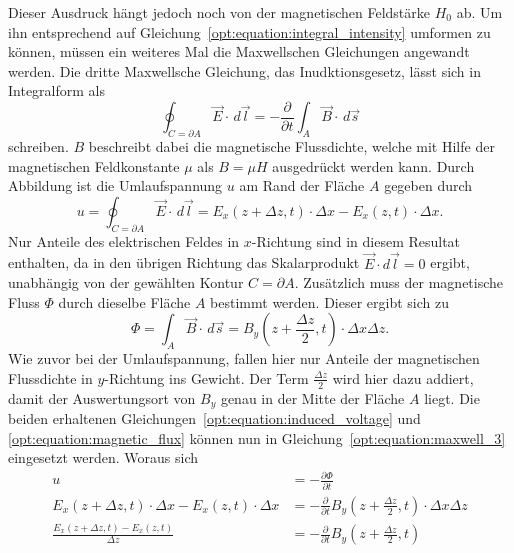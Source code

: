 Dieser Ausdruck hängt jedoch noch von der magnetischen Feldstärke $H_0$ ab.
Um ihn entsprechend auf Gleichung~\ref{opt:equation:integral_intensity} umformen zu können, müssen ein weiteres Mal die Maxwellschen Gleichungen angewandt werden.
Die dritte Maxwellsche Gleichung, das Inudktionsgesetz, lässt sich in Integralform als
\begin{equation}
\oint_{C=\partial A} \vec{E} \cdot\, d\vec{l}
=
-\frac{\partial}{\partial t} \int_{A} \vec{B} \cdot\, d\vec{s}
\label{opt:equation:maxwell_3}
\end{equation}
schreiben.
$B$ beschreibt dabei die magnetische Flussdichte, welche mit Hilfe der magnetischen Feldkonstante $\mu$ als $B = \mu H$ ausgedrückt werden kann.
Durch Abbildung  ist die Umlaufspannung $u$ am Rand der Fläche $A$ gegeben durch
\begin{equation}
u
=
\oint_{C=\partial A} \vec{E} \cdot\, d\vec{l}
=
E_x(z+\Delta z,t) \cdot \Delta x - E_x(z,t) \cdot \Delta x
.
\label{opt:equation:induced_voltage}
\end{equation}
Nur Anteile des elektrischen Feldes in $x$-Richtung sind in diesem Resultat enthalten, da in den übrigen Richtung das Skalarprodukt $\vec{E} \cdot d\vec{l} = 0$ ergibt, unabhängig von der gewählten Kontur $C = \partial A$.
Zusätzlich muss der magnetische Fluss $\Phi$ durch dieselbe Fläche $A$ bestimmt werden.
Dieser ergibt sich zu
\begin{equation}
\Phi
=
\int_{A} \vec{B} \cdot\, d\vec{s}
=
B_y\left(z+\frac{\Delta z}{2},t\right) \cdot \Delta x \Delta z
.
\label{opt:equation:magnetic_flux}
\end{equation}
Wie zuvor bei der Umlaufspannung, fallen hier nur Anteile der magnetischen Flussdichte in $y$-Richtung ins Gewicht.
Der Term $\frac{\Delta z}{2}$ wird hier dazu addiert, damit der Auswertungsort von $B_y$ genau in der Mitte der Fläche $A$ liegt.
Die beiden erhaltenen Gleichungen~\ref{opt:equation:induced_voltage} und \ref{opt:equation:magnetic_flux} können nun in Gleichung~\ref{opt:equation:maxwell_3} eingesetzt werden.
Woraus sich
\begin{align}
u
&=
-\frac{\partial\Phi}{\partial t}
\\
E_x(z+\Delta z,t) \cdot \Delta x - E_x(z,t) \cdot \Delta x
&=
-\frac{\partial}{\partial t} B_y\left(z+\frac{\Delta z}{2},t\right) \cdot \Delta x \Delta z
\\
\frac{E_x(z+\Delta z,t) - E_x(z,t)}{\Delta z}
&=
-\frac{\partial}{\partial t} B_y\left(z+\frac{\Delta z}{2},t\right)
\end{align}
